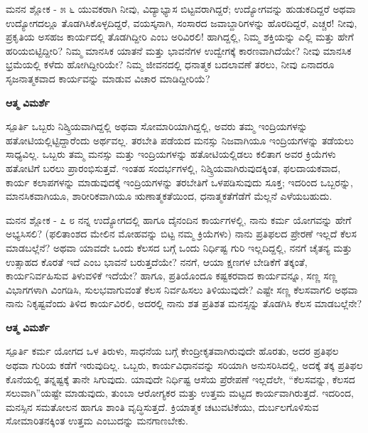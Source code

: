 \newpage
\begin{mananam}{\mananamfont ಮನನ ಶ್ಲೋಕ - ೫ ೬}
\mananamtext ಯುವಕರಾಗಿ ನೀವು, ವಿದ್ಯಾಭ್ಯಾಸ ಬಿಟ್ಟವರಾಗಿದ್ದರೆ; ಉದ್ಯೋಗವನ್ನು ಹುಡುಕದಿದ್ದರೆ ಅಥವಾ ಉದ್ಯೋಗದಲ್ಲೂ ತೊಡಗಿಸಿಕೊಳ್ಳದಿದ್ದರೆ, ವಯಸ್ಕನಾಗಿ, ಸಂಸಾರದ ಜವಾಬ್ದಾರಿಗಳನ್ನು ಹೊರದಿದ್ದರೆ, ಎಚ್ಚರ! ನೀವು, ಪ್ರಕೃತಿಯ ಅಸಹಜ ಕಾರ್ಯದಲ್ಲಿ ತೊಡಗಿದ್ದೀರಿ ಎಂಬ ಅರಿವಿರಲಿ! ಹಾಗಿದ್ದಲ್ಲಿ, ನಿಮ್ಮ ಶಕ್ತಿಯನ್ನು ಎಲ್ಲಿ ಮತ್ತು ಹೇಗೆ ಹರಿಯಬಿಟ್ಟಿದ್ದೀರಿ? ನಿಮ್ಮ ಮಾನಸಿಕ ಯಾತನೆ ಮತ್ತು ಭಾವನೆಗಳ ಉದ್ವೇಗಕ್ಕೆ ಕಾರಣವಾಗಿದೆಯೇ? ನೀವು ಮಾನಸಿಕ ಭ್ರಮೆಯಲ್ಲಿ ಕಳೆದು ಹೋಗಿದ್ದೀರಿಯೇ? ನಿಮ್ಮ ಜೀವನದಲ್ಲಿ ಧನಾತ್ಮಕ ಬದಲಾವಣೆ ತರಲು, ನೀವು ಏನಾದರೂ ಸೃಜನಾತ್ಮಕವಾದ ಕಾರ್ಯವನ್ನು ಮಾಡುವ ವಿಚಾರ ಮಾಡಿದ್ದೀರಿಯೆ?
\end{mananam}
\WritingHand\enspace\textbf{ಆತ್ಮ ವಿಮರ್ಶೆ}\\
\begin{inspiration}{\mananamfont ಸ್ಪೂರ್ತಿ}
\mananamtext ಒಬ್ಬರು ನಿಶ್ಕ್ರಿಯವಾಗಿದ್ದಲ್ಲಿ ಅಥವಾ ಸೋಮಾರಿಯಾಗಿದ್ದಲ್ಲಿ, ಅವರು ತಮ್ಮ ಇಂದ್ರಿಯಗಳನ್ನು ಹತೋಟಿಯಲ್ಲಿಟ್ಟಿದ್ದಾರೆಂದು ಅರ್ಥವಲ್ಲ. ತರಬೇತಿ ಪಡೆಯದ ಮನಸ್ಸು ನಿಜವಾಗಿಯೂ ಇಂದ್ರಿಯಗಳನ್ನು ತಡೆಯಲು ಸಾಧ್ಯವಿಲ್ಲ. ಒಬ್ಬರು ತಮ್ಮ ಮನಸ್ಸು ಮತ್ತು ಇಂದ್ರಿಯಗಳನ್ನು ಹತೋಟಿಯಲ್ಲಿಡಲು ಕಲಿತಾಗ ಅವರ ಕ್ರಿಯೆಗಳು ಹತೋಟಿಗೆ ಬರಲು ಪ್ರಾರಂಭಿಸುತ್ತವೆ. ಇಂತಹ ಸಂದರ್ಭಗಳಲ್ಲಿ, ನಿಶ್ಕ್ರಿಯವಾಗಿರುವುದಕ್ಕಿಂತ, ಫಲದಾಯಕವಾದ, ಕಾರ್ಯ ಕಲಾಪಗಳನ್ನು ಮಾಡುವುದಕ್ಕೆ ಇಂದ್ರಿಯಗಳನ್ನು ತರಬೇತಿಗೆ ಒಳಪಡಿಸುವುದು ಸೂಕ್ತ; ಇದರಿಂದ ಒಬ್ಬರನ್ನು, ಮಾನಸಿಕವಾಗಿಯೂ, ಶಾರೀರಿಕವಾಗಿಯೂ ಋಣಾತ್ಮಕತೆಯಿಂದ, ಧನಾತ್ಮಕತೆಗೆಡೆಗೆ ಮೆಲ್ಲನೆ ಎಳೆಯಬಹುದು.
\end{inspiration}
\newpage

\begin{mananam}{\mananamfont ಮನನ ಶ್ಲೋಕ - ೭ ೮}
\mananamtext ನನ್ನ ಉದ್ಯೋಗದಲ್ಲಿ ಹಾಗೂ ದೈನಂದಿನ ಕಾರ್ಯಗಳಲ್ಲಿ, ನಾನು ಕರ್ಮ ಯೋಗವನ್ನು ಹೇಗೆ ಅಭ್ಯಸಿಸಲಿ? (ಫಲಿತಾಂಶದ ಮೇಲಿನ ಮೋಹವನ್ನು ಬಿಟ್ಟ ನಮ್ಮ ಕ್ರಿಯೆಗಳು) ನಾನು ಪ್ರತಿಫಲದ ಪ್ರೇರಣೆ ಇಲ್ಲದೆ ಕೆಲಸ ಮಾಡಬಲ್ಲೆನೆ? ಅಥವಾ ಯಾವದೇ ಒಂದು ಕೆಲಸದ ಬಗ್ಗೆ ಒಂದು ನಿರ್ಧಿಷ್ಟ ಗುರಿ ಇಲ್ಲದಿದ್ದಲ್ಲಿ, ನನಗೆ ಚೈತನ್ಯ ಮತ್ತು ಉತ್ಸಾಹದ ಕೊರತೆ ಇದೆ ಎಂಬ ಭಾವನೆ ಬರುತ್ತದೆಯೇ? ನನಗೆ, ಆಯಾ ಕ್ಷಣಗಳ ಬೇಡಿಕೆಗೆ ತಕ್ಕಂತೆ, ಕಾರ್ಯನಿರ್ವಹಿಸುವ ತಿಳುವಳಿಕೆ ಇದೆಯೇ? ಹಾಗೂ, ಪ್ರತಿಯೊಂದೂ ಕಷ್ಟಕರವಾದ ಕಾರ್ಯವನ್ನೂ, ಸಣ್ಣ ಸಣ್ಣ ವಿಭಾಗಗಳಾಗಿ ವಿಂಗಡಿಸಿ, ಸುಲಭವಾಗುವಂತೆ ಕೆಲಸ ನಿರ್ವಹಿಸಲು ತಿಳಿಯುವುದೇ? ಎಷ್ಟೇ ಸಣ್ಣ ಕೆಲಸವಾಗಲಿ ಅಥವಾ ನಾನು ನಿಕೃಷ್ಟವೆಂದು ತಿಳಿದ ಕಾರ್ಯವಿರಲಿ, ಅದರಲ್ಲಿ ನಾನು ಶತ ಪ್ರತಿಶತ ಮನಸ್ಸನ್ನು ತೊಡಗಿಸಿ ಕೆಲಸ ಮಾಡಬಲ್ಲೆನೇ?
\end{mananam}
\WritingHand\enspace\textbf{ಆತ್ಮ ವಿಮರ್ಶೆ}\\
\begin{inspiration}{\mananamfont ಸ್ಪೂರ್ತಿ}
\mananamtext  ಕರ್ಮ ಯೋಗದ ಒಳ ತಿರುಳು, ಸಾಧನೆಯ ಬಗ್ಗೆ  ಕೇಂದ್ರೀಕೃತವಾಗಿರುವುದೇ ಹೊರತು, ಅದರ ಪ್ರತಿಫಲ ಅಥವಾ ಗುರಿಯ ಕಡೆಗೆ ಇರುವುದಿಲ್ಲ. ಒಬ್ಬರು, ಕಾರ್ಯವಿಧಾನವನ್ನು ಸರಿಯಾಗಿ ಅನುಸರಿಸಿದಲ್ಲಿ, ಅದಕ್ಕೆ ತಕ್ಕ ಪ್ರತಿಫಲ ಕೊನೆಯಲ್ಲಿ  ತನ್ನಷ್ಟಕ್ಕೆ ತಾನೇ ಸಿಗುವುದು. ಯಾವುದೇ ನಿರ್ಧಿಷ್ಟ ಆಸೆಯ ಪ್ರೆರೇಪಣೆ ಇಲ್ಲದೆಲೇ, “ಕೆಲಸವನ್ನು, ಕೆಲಸದ ಸಲುವಾಗಿ”ಯಷ್ಟೇ ಮಾಡುವುದು, ತುಂಬಾ ಆರೋಗ್ಯಕರ ಮತ್ತು ಉತ್ತಮ ಮಟ್ಟದ ಕಾರ್ಯವಾಗಿರುತ್ತದೆ. ಇದರಿಂದ, ಮನಸ್ಸಿನ ಸಮತೋಲನ ಹಾಗೂ ಶಾಂತಿ ವೃದ್ಧಿಸುತ್ತದೆ. ಕ್ರಿಯಾತ್ಮಕ ಚಟುವಟಿಕೆಯು, ದುರ್ಬಲಗೊಳಿಸುವ ಸೋಮಾರಿತನಕ್ಕಿಂತ ಉತ್ತಮ ಎಂಬುದನ್ನು ಮನಗಾಣಬೇಕು. 
\end{inspiration}
\newpage

